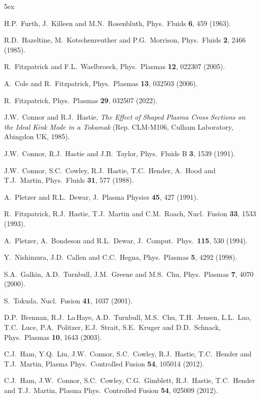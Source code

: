 \documentclass[12pt,prb,aps]{revtex4-1}
\begin{document}
\begin{thebibliography}{99}\baselineskip 5ex

 H.P.~Furth,  J.~Killeen and M.N.~Rosenbluth,  Phys.\ Fluids {\bf 6}, 459 (1963).

 R.D.~Hazeltine, M.~Kotschenreuther and P.G.~Morrison, Phys.\ Fluids {\bf 2}, 2466  (1985). 

 R.~Fitzpatrick and F.L.~Waelbroeck, Phys.\ Plasmas {\bf 12}, 022307 (2005).

 A.~Cole and R.~Fitzpatrick, Phys.\ Plasmas {\bf 13}, 032503 (2006).

 R.~Fitzpatrick, Phys.\ Plasmas {\bf 29}, 032507 (2022).

 J.W.~Connor and R.J.~Hastie, {\em The Effect of Shaped Plasma Cross Sections on the Ideal Kink Mode in a Tokamak}\/ (Rep. CLM-M106, Culham Laboratory, Abingdon UK, 1985).

 J.W.~Connor, R.J.~Hastie and J.B.~Taylor, Phys.\ Fluids B {\bf 3}, 1539 (1991).

 J.W.~Connor,  S.C.~Cowley, R.J.~Hastie,  T.C.~Hender,  A.~Hood  and T.J.~Martin,  Phys.\ Fluids {\bf 31}, 577 (1988).

 A.~Pletzer and R.L.~Dewar, J.\ Plasma Physics {\bf 45}, 427 (1991).

 R.~Fitzpatrick, R.J.~Hastie, T.J.~Martin and C.M.~Roach, Nucl.\ Fusion {\bf 33}, 1533 (1993).

  A.~Pletzer, A.~Bondeson and R.L.~Dewar, J.\ Comput.\ Phys.\ {\bf 115}, 530 (1994).

 Y.~Nishimura, J.D.~Callen and C.C.~Hegna, Phys.\ Plasmas {\bf 5}, 4292 (1998).

 S.A.~Galkin, A.D.~Turnbull, J.M.~Greene and M.S.~Chu, Phys.\ Plasmas {\bf 7}, 4070 (2000). 

 S.~Tokuda, Nucl.\ Fusion {\bf 41}, 1037 (2001).

 D.P.~Brennan, R.J.~La\,Haye, A.D.~Turnbull, M.S.~Chu, T.H.~Jensen, L.L.~Lao, T.C.~Luce, P.A.~Politzer,
E.J.~Strait, S.E.~Kruger and D.D.~Schnack, Phys.\ Plasmas {\bf 10}, 1643 (2003).

  C.J.~Ham, Y.Q.~Liu, J.W.~Connor, S.C.~Cowley, R.J.~Hastie, T.C.~Hender and T.J.~Martin, Plasma Phys.\ Controlled Fusion {\bf 54}, 105014 (2012). 

 C.J.~Ham, J.W.~Connor, S.C.~Cowley, C.G.~Gimblett, R.J.~Hastie, T.C.~Hender and T.J.~Martin, Plasma Phys.\ Controlled Fusion {\bf 54}, 025009 (2012). 


\end{thebibliography}
\end{document}
